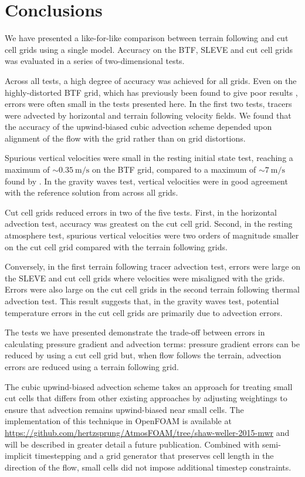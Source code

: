 \documentclass{ametsoc}
\begin{document}
\section{Conclusions}
We have presented a like-for-like comparison between terrain following and cut cell grids using a single model.  Accuracy on the BTF, SLEVE and cut cell grids was evaluated in a series of two-dimensional tests.

Across all tests, a high degree of accuracy was achieved for all grids.  Even on the highly-distorted BTF grid, which has previously been found to give poor results \citep{schaer2002,klemp2011,good2014}, errors were often small in the tests presented here.  In the first two tests, tracers were advected by horizontal and terrain following velocity fields.  We found that the accuracy of the upwind-biased cubic advection scheme depended upon alignment of the flow with the grid rather than on grid distortions.

Spurious vertical velocities were small in the resting initial state test, reaching a maximum of $\sim \SI{0.35}{\meter\per\second}$ on the BTF grid, compared to a maximum of $\sim \SI{7}{\meter\per\second}$ found by \citet{klemp2011}.  In the gravity waves test, vertical velocities were in good agreement with the reference solution from \citet{melvin2010} across all grids.

Cut cell grids reduced errors in two of the five tests.  First, in the horizontal advection test, accuracy was greatest on the cut cell grid.  Second, in the resting atmosphere test, spurious vertical velocities were two orders of magnitude smaller on the cut cell grid compared with the terrain following grids.

Conversely, in the first terrain following tracer advection test, errors were large on the SLEVE and cut cell grids where velocities were misaligned with the grids.  Errors were also large on the cut cell grids in the second terrain following thermal advection test.  This result suggests that, in the gravity waves test, potential temperature errors in the cut cell grids are primarily due to advection errors.

The tests we have presented demonstrate the trade-off between errors in calculating pressure gradient and advection terms: pressure gradient errors can be reduced by using a cut cell grid but, when flow follows the terrain, advection errors are reduced using a terrain following grid.

The cubic upwind-biased advection scheme takes an approach for treating small cut cells that differs from other existing approaches by adjusting weightings to ensure that advection remains upwind-biased near small cells.  The implementation of this technique in OpenFOAM is available at \url{https://github.com/hertzsprung/AtmosFOAM/tree/shaw-weller-2015-mwr} and will be described in greater detail a future publication.  Combined with semi-implicit timestepping and a grid generator that preserves cell length in the direction of the flow, small cells did not impose additional timestep constraints.
\end{document}
